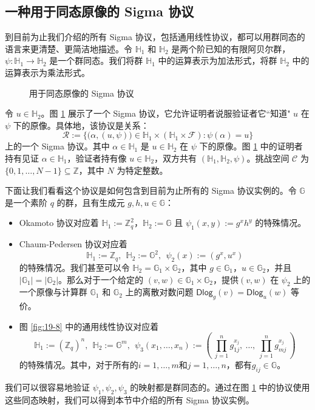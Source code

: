 \subsection{一种用于同态原像的 Sigma 协议}

到目前为止我们介绍的所有 Sigma 协议，包括通用线性协议，都可以用群同态的语言来更清楚、更简洁地描述。令 $\mathbb{H}_1$ 和 $\mathbb{H}_2$ 是两个阶已知的有限阿贝尔群，$\psi:\mathbb{H}_1\to\mathbb{H}_2$ 是一个群同态。我们将群 $\mathbb{H}_1$ 中的运算表示为加法形式，将群 $\mathbb{H}_2$ 中的运算表示为乘法形式。

\begin{figure}
  \centering
  
  \caption{用于同态原像的 Sigma 协议}
  \label{fig:19-9}
\end{figure}

令 $u\in\mathbb{H}_2$。图 \ref{fig:19-9} 展示了一个 Sigma 协议，它允许证明者说服验证者它``知道" $u$ 在 $\psi$ 下的原像。具体地，该协议是关系：
\begin{equation}\label{eq:19-15}
\mathcal{R}:=\bigg\lbrace
\Big(\alpha,(u,\psi)\Big)\in\mathbb{H}_1\times(\mathbb{H}_1\times\mathcal{F}):\psi(\alpha)=u
\bigg\rbrace
\end{equation}
上的一个 Sigma 协议。其中 $\alpha\in\mathbb{H}_1$ 是 $u\in\mathbb{H}_2$ 在 $\psi$ 下的原像。图 \ref{fig:19-9} 中的证明者持有见证 $\alpha\in\mathbb{H}_1$，验证者持有像 $u\in\mathbb{H}_2$，双方共有 $(\mathbb{H}_1,\mathbb{H}_2,\psi)$。挑战空间 $\mathcal{C}$ 为 $\{0,1,\dots,N-1\}\subseteq\mathbb{Z}$，其中 $N$ 为特定整数。

下面让我们看看这个协议是如何包含到目前为止所有的 Sigma 协议实例的。令 $\mathbb{G}$ 是一个素阶 $q$ 的群，且有生成元 $g,h,u\in\mathbb{G}$：
\begin{itemize}
	\item Okamoto 协议对应着 $\mathbb{H}_1:=\mathbb{Z}_q^2$，$\mathbb{H}_2:=\mathbb{G}$ 且 $\psi_1(x,y):=g^xh^y$ 的特殊情况。
	\item Chaum-Pedersen 协议对应着
	$$\mathbb{H}_1:=\mathbb{Z}_q,~~\mathbb{H}_2:=\mathbb{G}^2, ~~\psi_2(x):=(g^x,u^x)$$
	的特殊情况。我们甚至可以令 $\mathbb{H}_2=\mathbb{G}_1\times\mathbb{G}_2$，其中 $g\in\mathbb{G}_1$，$u\in\mathbb{G}_2$，并且 $|\mathbb{G}_1|=|\mathbb{G}_2|$。那么对于一个给定的 $(v,w)\in\mathbb{G}_1\times\mathbb{G}_2$，提供$(v, w)$ 在 $\psi_2$ 上的一个原像与计算群 $\mathbb{G}_1$ 和 $\mathbb{G}_2$ 上的离散对数问题 $\mathsf{Dlog}_g(v)=\mathsf{Dlog}_u(w)$ 等价。
	\item 图 \ref{fig:19-8} 中的通用线性协议对应着
	$$
    \mathbb{H}_1:=(\mathbb{Z}_q)^n,~~
    \mathbb{H}_2:=\mathbb{G}^m,~~
    \psi_3(x_1,\dots,x_n):=
    \left(
    ~\prod_{j=1}^ng_{1j}^{x_j},~\dots,~\prod_{j=1}^ng_{mj}^{x_j}~
    \right)
    $$
    的特殊情况。其中，对于所有的$i=1,\dots,m$和$j=1,\dots,n$，都有$g_{ij}\in\mathbb{G}$。
\end{itemize}
我们可以很容易地验证 $\psi_1,\psi_2,\psi_3$ 的映射都是群同态的。通过在图 \ref{fig:19-9} 中的协议使用这些同态映射，我们可以得到本节中介绍的所有 Sigma 协议实例。

